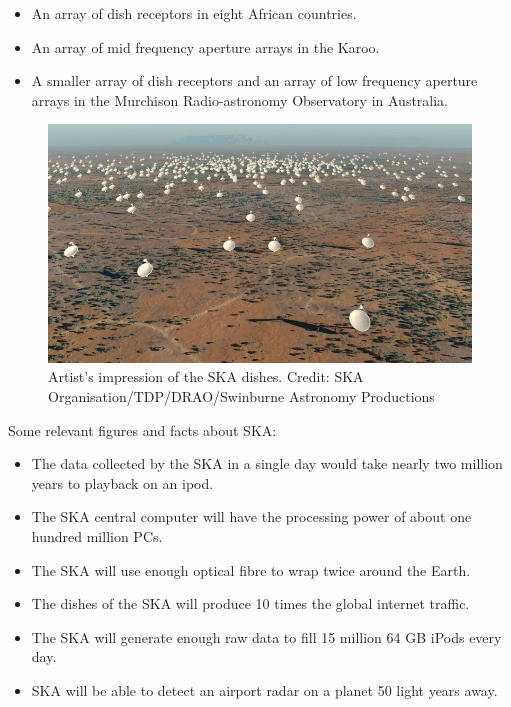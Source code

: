 \begin{itemize}
\item An array of dish receptors in eight African countries. 
\item An array of mid frequency aperture arrays in the Karoo. 
\item A smaller array of dish receptors and an array of low frequency aperture arrays in the Murchison Radio-astronomy Observatory in Australia.
\end{itemize}

 \begin{figure}[tb]
 \centering
 \includegraphics[width=\textwidth]{images/ska.jpg}
 \caption{Artist's impression of the SKA dishes. Credit: SKA Organisation/TDP/DRAO/Swinburne Astronomy Productions}
 \end{figure}

Some relevant figures and facts about SKA:

\begin{itemize}

\item The data collected by the SKA in a single day would take nearly two million years to playback on an ipod.
\item The SKA central computer will have the processing power of about one hundred million PCs.
\item The SKA will use enough optical fibre to wrap twice around the Earth.
\item The dishes of the SKA will produce 10 times the global internet traffic.
\item The SKA will generate enough raw data to fill 15 million 64 GB iPods every day.
\item SKA will be able to detect an airport radar on a planet 50 light years away.

\end{itemize}

